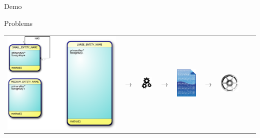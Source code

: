 \documentclass[table,15pt,t]{beamer}
\newcommand{\vmiddle}[1]{
  \vspace{\stretch{1}}
  #1
  \vspace{\stretch{1}}
}
\newcommand{\interframe}[1]{
\begin{frame}{}
\vmiddle{\hmiddle{\Huge #1}}
\end{frame}
}
\newcommand{\hmiddle}[1]{
  \begin{center}#1\end{center}
}
\newcounter{i}
\begin{document}
\interframe{Demo}

\begin{frame}{Problems}
  \begin{tabularx}{\textwidth}{ccccccccc}
    \includegraphics[scale=0.06]{figs/model}
    & $\rightarrow$
    & \includegraphics[scale=1]{figs/gears}
    & $\rightarrow$
    & \includegraphics[scale=0.3]{figs/document}
    & $\rightarrow$
    & \includegraphics[scale=0.7]{figs/alloy}

\end{tabularx}
\end{frame}
\end{document}
